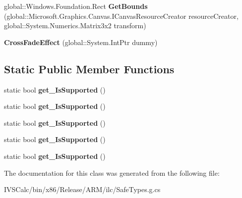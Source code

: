 \begin{DoxyCompactItemize}
\mbox{\label{class_microsoft_1_1_graphics_1_1_canvas_1_1_effects_1_1_cross_fade_effect_ab77a284b694bb6816a8514e82b3924f0}} 
global\+::\+Windows.\+Foundation.\+Rect {\bfseries Get\+Bounds} (global\+::\+Microsoft.\+Graphics.\+Canvas.\+I\+Canvas\+Resource\+Creator resource\+Creator, global\+::\+System.\+Numerics.\+Matrix3x2 transform)
\item 
\mbox{\label{class_microsoft_1_1_graphics_1_1_canvas_1_1_effects_1_1_cross_fade_effect_a1ccb8010e1721e5b73f7f2d332372d07}} 
{\bfseries Cross\+Fade\+Effect} (global\+::\+System.\+Int\+Ptr dummy)
\end{DoxyCompactItemize}
\subsection*{Static Public Member Functions}
\begin{DoxyCompactItemize}
\item 
\mbox{\label{class_microsoft_1_1_graphics_1_1_canvas_1_1_effects_1_1_cross_fade_effect_a5345b990c5ad468ecca336b073b33503}} 
static bool {\bfseries get\+\_\+\+Is\+Supported} ()
\item 
\mbox{\label{class_microsoft_1_1_graphics_1_1_canvas_1_1_effects_1_1_cross_fade_effect_a5345b990c5ad468ecca336b073b33503}} 
static bool {\bfseries get\+\_\+\+Is\+Supported} ()
\item 
\mbox{\label{class_microsoft_1_1_graphics_1_1_canvas_1_1_effects_1_1_cross_fade_effect_a5345b990c5ad468ecca336b073b33503}} 
static bool {\bfseries get\+\_\+\+Is\+Supported} ()
\item 
\mbox{\label{class_microsoft_1_1_graphics_1_1_canvas_1_1_effects_1_1_cross_fade_effect_a5345b990c5ad468ecca336b073b33503}} 
static bool {\bfseries get\+\_\+\+Is\+Supported} ()
\item 
\mbox{\label{class_microsoft_1_1_graphics_1_1_canvas_1_1_effects_1_1_cross_fade_effect_a5345b990c5ad468ecca336b073b33503}} 
static bool {\bfseries get\+\_\+\+Is\+Supported} ()
\end{DoxyCompactItemize}


The documentation for this class was generated from the following file\+:\begin{DoxyCompactItemize}
\item 
I\+V\+S\+Calc/bin/x86/\+Release/\+A\+R\+M/ilc/Safe\+Types.\+g.\+cs\end{DoxyCompactItemize}
